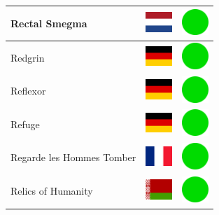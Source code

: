 \documentclass[12pt, a4paper, twoside]{report}
\begin{document}
\begin{center}
\begin{longtable}{|p{5cm}|p{2cm}|p{2cm}|}
 Rectal Smegma                                              & \includegraphics[width=1cm]{../4x3/nl} &   \includegraphics[width=1cm]{../likes/y} \\ \hline
 Redgrin                                                    & \includegraphics[width=1cm]{../4x3/de} &   \includegraphics[width=1cm]{../likes/y} \\ \hline
 Reflexor                                                   & \includegraphics[width=1cm]{../4x3/de} &   \includegraphics[width=1cm]{../likes/y} \\ \hline
 Refuge                                                     & \includegraphics[width=1cm]{../4x3/de} &   \includegraphics[width=1cm]{../likes/y} \\ \hline
 Regarde les Hommes Tomber                                  & \includegraphics[width=1cm]{../4x3/fr} &   \includegraphics[width=1cm]{../likes/y} \\ \hline
 Relics of Humanity                                         & \includegraphics[width=1cm]{../4x3/by} &   \includegraphics[width=1cm]{../likes/y} \\ \hline

\end{longtable}
\end{center}
\end{document}
